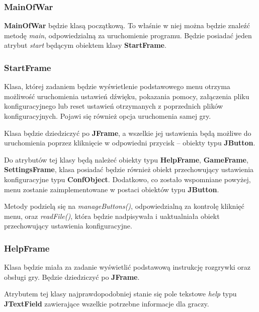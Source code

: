 \documentclass[a4paper]{article}
\begin{document}
\subsubsection{MainOfWar}
\quad \textbf{MainOfWar} b\k{e}dzie klas\k{a} pocz\k{a}tkow\k{a}. To w\l{}a\'snie w niej mo\.zna b\k{e}dzie znale\'z\'c metod\k{e} \textit{main}, odpowiedzialn\k{a} za uruchomienie programu. 
B\k{e}dzie posiada\'c jeden atrybut \textit{start} b\k{e}d\k{a}cym obiektem klasy \textbf{StartFrame}.

\subsubsection{StartFrame}

\quad Klasa, kt\'orej zadaniem b\k{e}dzie wy\'swietlenie podstawowego menu otrzyma mo\.zliwo\'s\'c uruchomienia ustawie\'n d\'zwi\k{e}ku, pokazania pomocy, za\l{}\k{a}czenia pliku konfiguracyjnego lub reset ustawie\'n otrzymanych z poprzednich plik\'ow konfiguracyjnych. 
Pojawi si\k{e} r\'ownie\.z opcja uruchomenia samej gry.

Klasa b\k{e}dzie dziedziczy\'c po \textbf{JFrame}, a wszelkie jej ustawienia b\k{e}d\k{a} mo\.zliwe do uruchomienia poprzez klikni\k{e}cie w odpowiedni przycisk – obiekty typu \textbf{JButton}.

Do atrybut\'ow tej klasy b\k{e}d\k{a} nale\.ze\'c obiekty typu \textbf{HelpFrame}, \textbf{GameFrame}, \textbf{SettingsFrame}, klasa posiada\'c b\k{e}dzie r\'ownie\.z obiekt przechowuj\k{a}cy ustawienia konfiguracyjne typu \textbf{ConfObject}. Dodatkowo, co zosta\l{}o wspomniane powy\.zej, menu zostanie zaimplementowane w postaci obiekt\'ow typu \textbf{JButton}.

Metody podziel\k{a} si\k{e} na \textit{manageButtons()}, odpowiedzialn\k{a} za kontrol\k{e} klikni\k{e}\'c menu, oraz \textit{readFile()}, kt\'ora b\k{e}dzie nadpisywa\l{}a i uaktualnia\l{}a obiekt przechowuj\k{a}cy ustawienia konfiguracyjne.

\subsubsection{HelpFrame}

\quad Klasa b\k{e}dzie mia\l{}a za zadanie wy\'swietli\'c podstawow\k{a} instrukcj\k{e} rozgrywki oraz obs\l{}ugi gry. B\k{e}dzie dziedziczy\'c po \textbf{JFrame}.

Atrybutem tej klasy najprawdopodobniej stanie si\k{e} pole tekstowe \textit{help} typu \textbf{JTextField} zawieraj\k{a}ce wszelkie potrzebne informacje dla graczy.
\end{document}
